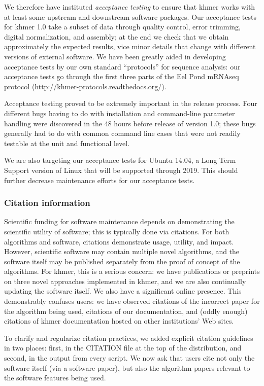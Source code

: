 \documentclass[12pt]{article}
\begin{document}
We therefore have instituted {\em acceptance testing} to ensure that
khmer works with at least some upstream and downstream software
packages.  Our acceptance tests for khmer 1.0 take a subset of data
through quality control, error trimming, digital normalization, and
assembly; at the end we check that we obtain approximately the
expected results, vice minor details that change with different
versions of external software.  We have been greatly aided in
developing acceptance tests by our own standard ``protocols'' for sequence
analysis: our acceptance tests go through the first three parts of the
Eel Pond mRNAseq protocol (http://khmer-protocols.readthedocs.org/).

Acceptance testing proved to be extremely important in the release
process.  Four different bugs having to do with installation and
command-line parameter handling were discovered in the 48 hours before
release of version 1.0; these bugs generally had to do with common command line
cases that were not readily testable at the unit and functional level.

We are also targeting our acceptance tests for Ubuntu 14.04, a Long
Term Support version of Linux that will be supported through 2019.
This should further decrease maintenance efforts for our acceptance
tests.

\subsubsection{Citation information}

Scientific funding for software maintenance depends on demonstrating
the scientific utility of software; this is typically done via
citations.  For both algorithms and software, citations demonstrate
usage, utility, and impact.  However, scientific software may contain
multiple novel algorithms, and the software itself may be published
separately from the proof of concept of the algorithms.  For khmer,
this is a serious concern: we have publications or preprints on three
novel approaches implemented in khmer, and we are also continually
updating the software itself.  We also have a significant online
presence. This demonstrably confuses users: we have observed citations
of the incorrect paper for the algorithm being used, citations of our
documentation, and (oddly enough) citations of khmer documentation
hosted on other institutions' Web sites.

To clarify and regularize citation practices, we added explicit
citation guidelines in two places: first, in the CITATION file at the
top of the distribution, and second, in the output from every script.
We now ask that users cite not only the software itself (via a
software paper), but also the algorithm papers relevant to the
software features being used.
\end{document}
